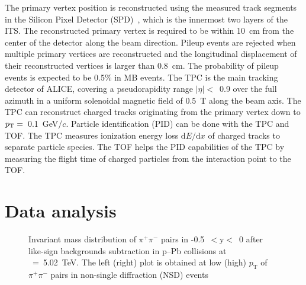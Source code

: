 The primary vertex position is reconstructed using the measured track segments in the Silicon Pixel Detector (SPD)~\cite{Santoro2009:ALICESPD}, which is the innermost two layers of the ITS. The reconstructed primary vertex is required to be within 10~cm from the center of the detector along the beam direction. Pileup events are rejected when multiple primary vertices are reconstructed and the longitudinal displacement of their reconstructed vertices is larger than 0.8~cm. The probability of pileup events is expected to be 0.5\% in MB events. The TPC is the main tracking detector of ALICE, covering a pseudorapidity range $|\eta|<$~0.9 over the full azimuth in a uniform solenoidal magnetic field of 0.5~T along the beam axis. The TPC can reconstruct charged tracks originating from the primary vertex down to $p_{\rm{T}}=$~0.1~GeV/$c$. Particle identification (PID) can be done with the TPC and TOF. The TPC measures ionization energy loss $\mathrm{d}E/\mathrm{d}x$ of charged tracks to separate particle species. The TOF helps the PID capabilities of the TPC by measuring the flight time of charged particles from the interaction point to the TOF.

\section{Data analysis}
\label{sec:ana}
\begin{figure}[hbt!]
	\centering
	\caption{ Invariant mass distribution of $\pi^{+}\pi^{-}$ pairs in -0.5~$<\mathrm{y}<$~0 after like-sign backgrounds subtraction in p--Pb collisions at \snn~=~5.02~TeV. The left (right) plot is obtained at low (high) $p_{\mathrm{T}}$ of $\pi^{+}\pi^{-}$ pairs in non-single diffraction (NSD) events }
	\label{fig:SigExt}
\end{figure}

